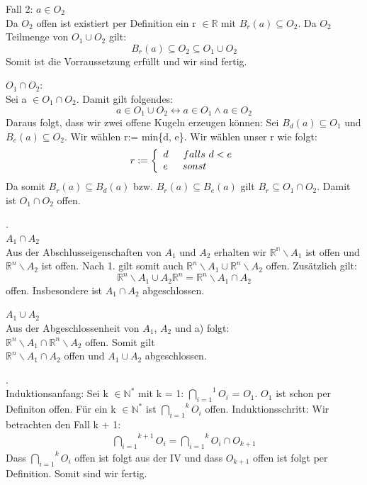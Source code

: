 \documentclass{article}
\begin{document}
\noindent Fall 2: $a \in O_2$ \\
Da $O_2$ offen ist existiert per Definition ein r $\in \mathds{R}$ mit $B_r(a) \subseteq O_2$. Da
$O_2$ Teilmenge von $O_1 \cup O_2$ gilt:
\[
    B_r(a) \subseteq O_2 \subseteq O_1 \cup O_2  
\]
Somit ist die Vorraussetzung erfüllt und wir sind fertig.

\noindent $O_1 \cap O_2$: \\ 
Sei a $\in O_1 \cap O_2$. Damit gilt folgendes: 
\[
    a \in O_1 \cup O_2 \leftrightarrow a \in O_1 \wedge a \in O_2
\]
Daraus folgt, dass wir zwei offene Kugeln erzeugen können: Sei $B_d(a) \subseteq O_1$ und 
$B_e(a) \subseteq O_2$. Wir wählen r:= min\{d, e\}. Wir wählen unser r wie folgt:
\begin{align*}
            r:=\left \{\begin{array}{ll} 
                d \indent falls \text{ } d < e \\ 
                e \indent sonst\\ 
     \end{array} \right. 
\end{align*}
Da somit $B_r(a) \subseteq B_d(a)$ bzw. $B_r(a) \subseteq B_e(a)$ gilt $B_r \subseteq O_1 \cap O_2$.
Damit ist $O_1 \cap O_2$ offen.

\bigskip
{}. \\
$A_1 \cap A_2$ \\ 
Aus der Abschlusseigenschaften von $A_1$ und $A_2$ erhalten wir $\mathds{R^{n}}\backslash A_1$
ist offen und $\mathds{R}^{n} \backslash A_2$ ist offen. Nach 1. gilt somit auch 
$\mathds{R}^{n} \backslash A_1 \cup \mathds{R}^{n} \backslash A_2$ offen. Zusätzlich 
gilt:
\[
    \mathds{R}^{n} \backslash A_1 \cup A_2 \mathds{R}^{n} = \mathds{R}^n \backslash A_1 \cap A_2 
\]
offen. Insbesondere ist $A_1 \cap A_2$ abgeschlossen.

\noindent $A_1 \cup A_2$ \\ 
Aus der Abgeschlossenheit von $A_1$, $A_2$ und a) folgt: \\
$\mathds{R}^{n} \backslash A_1 \cap \mathds{R}^{n} \backslash A_2$ 
offen. Somit gilt \\  
$\mathds{R}^n \backslash A_1 \cap A_2$ offen und $A_1 \cup A_2$ abgeschlossen. 

\bigskip
{}. \\ 
Induktionsanfang: Sei k $\in \mathds{N}^*$ mit k = 1:
$\overset{1}{\underset{i = 1}{\bigcap}} O_i$ = $O_1$. $O_1$ ist schon per Definiton offen.
\smallskip
Für ein k $\in \mathds{N}^*$ ist  $\overset{k}{\underset{i = 1}{\bigcap}} O_i$ offen.
\smallskip
Induktionsschritt: 
Wir betrachten den Fall k + 1:
\begin{align*}
    \overset{k+1}{\underset{i = 1}{\bigcap}} O_i =                                   
    \overset{k}{\underset{i = 1}{\bigcap}} O_i \cap O_{k + 1} 
\end{align*}
Dass $\overset{k}{\underset{i = 1}{\bigcap}} O_i$ offen ist folgt aus der IV und dass $O_{k + 1}$
offen ist folgt per Definition. Somit sind wir fertig.
\end{document}
